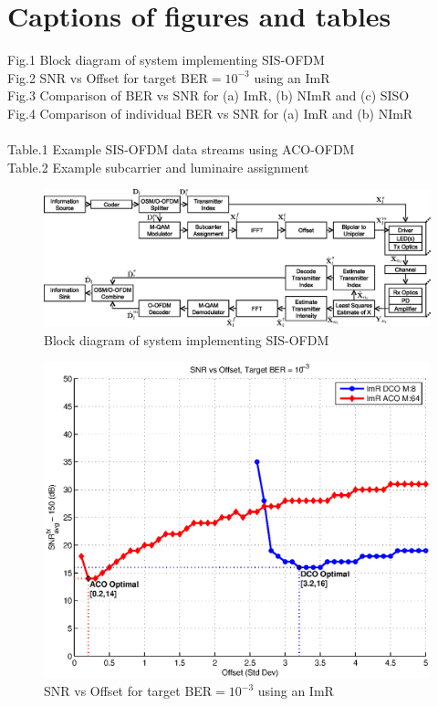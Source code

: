 \documentclass[12pt,letterpaper,onecolumn]{article} %
\begin{document}
\section*{Captions of figures and tables}
Fig.1 Block diagram of system implementing SIS-OFDM\\
Fig.2 SNR vs Offset for target BER$= 10^{-3}$ using an ImR\\
Fig.3 Comparison of BER vs SNR for (a) ImR, (b) NImR and (c) SISO\\
Fig.4 Comparison of individual BER vs SNR for (a) ImR and (b) NImR\\
\\
Table.1 Example SIS-OFDM data streams using ACO-OFDM\\
Table.2 Example subcarrier and luminaire assignment\\

\setcounter{figure}{0}

\newpage
\begin{figure}[htp]
	\centering
		\includegraphics[trim={0.0in 0.0in 0.0in 0.0in}, clip=false, width=6.6in]{figBlockDiagram2.eps}
	\caption{Block diagram of system implementing SIS-OFDM}
\end{figure}

\newpage
\begin{figure}[htp]
	\centering
		\includegraphics[trim={0.45in 0.25in 0.7in 0.0in}, clip=false, width=5in]{figSNRvsOfst.eps}
	\caption{SNR vs Offset for target BER$= 10^{-3}$ using an ImR}
\end{figure}
\end{document}
